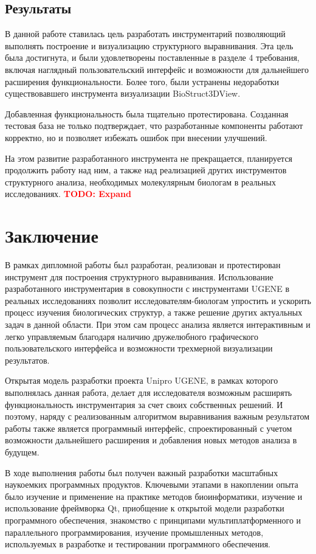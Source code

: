 \documentclass[a4paper, 12pt, titlepage, utf8]{extarticle}
\let\oldsection\section         %
\renewcommand{\section}{\newpage\oldsection}
\newcommand{\todo}[1]{\textbf{\textcolor{red}{TODO: #1}}}
\begin{document}
\newpage
\subsection{Результаты}
В данной работе ставилась цель разработать инструментарий позволяющий выполнять построение и визуализацию структурного выравнивания. Эта цель была достигнута, и были удовлетворены поставленные в разделе 4 требования, включая наглядный пользовательский интерфейс и возможности для дальнейшего расширения функциональности. Более того, были устранены недоработки существовавшего инструмента визуализации BioStruct3DView.

Добавленная функциональность была тщательно протестирована. Созданная тестовая база не только подтверждает, что разработанные компоненты работают корректно, но и позволяет избежать ошибок при внесении улучшений.

На этом развитие разработанного инструмента не прекращается, планируется продолжить работу над ним, а также над реализацией других инструментов структурного анализа, необходимых молекулярным биологам в реальных исследованиях.
\todo{Expand}


\section{Заключение}
В рамках дипломной работы был разработан, реализован и протестирован инструмент для построения структурного выравнивания. Использование разработанного инструментария в совокупности с инструментами UGENE в реальных исследованиях позволит исследователям-биологам упростить и ускорить процесс изучения биологических структур, а также решение других актуальных задач в данной области. При этом сам процесс анализа является интерактивным и легко управляемым благодаря наличию дружелюбного графического пользовательского интерфейса и возможности трехмерной визуализации результатов.

Открытая модель разработки проекта Unipro UGENE, в рамках которого выполнялась данная работа, делает для исследователя возможным расширять функциональность инструментария за счет своих собственных решений. И поэтому, наряду с реализованным алгоритмом выравнивания важным результатом работы также является программный интерфейс, спроектированный с учетом возможности дальнейшего расширения и добавления новых методов анализа в будущем.

В ходе выполнения работы был получен важный разработки масштабных наукоемких программных продуктов. Ключевыми этапами в накоплении опыта было изучение и применение на практике методов биоинформатики, изучение и использование фреймворка Qt, приобщение к открытой модели разработки программного обеспечения, знакомство с принципами мультиплатформенного и параллельного программирования, изучение промышленных методов, используемых в разработке и тестировании программного обеспечения.
\end{document}
